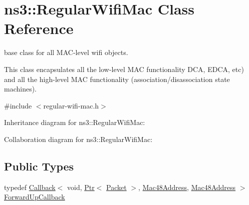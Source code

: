 \hypertarget{classns3_1_1RegularWifiMac}{}\section{ns3\+:\+:Regular\+Wifi\+Mac Class Reference}
\label{classns3_1_1RegularWifiMac}


base class for all M\+A\+C-\/level wifi objects.

This class encapsulates all the low-\/level M\+AC functionality D\+CA, E\+D\+CA, etc) and all the high-\/level M\+AC functionality (association/disassociation state machines).  




{\ttfamily \#include $<$regular-\/wifi-\/mac.\+h$>$}



Inheritance diagram for ns3\+:\+:Regular\+Wifi\+Mac\+:


Collaboration diagram for ns3\+:\+:Regular\+Wifi\+Mac\+:
\subsection*{Public Types}
\begin{DoxyCompactItemize}
\item 
typedef \hyperlink{classns3_1_1Callback}{Callback}$<$ void, \hyperlink{classns3_1_1Ptr}{Ptr}$<$ \hyperlink{classns3_1_1Packet}{Packet} $>$, \hyperlink{classns3_1_1Mac48Address}{Mac48\+Address}, \hyperlink{classns3_1_1Mac48Address}{Mac48\+Address} $>$ \hyperlink{classns3_1_1RegularWifiMac_a7f9bf4f4f1fc2514fcbf651015929225}{Forward\+Up\+Callback}
\end{DoxyCompactItemize}
